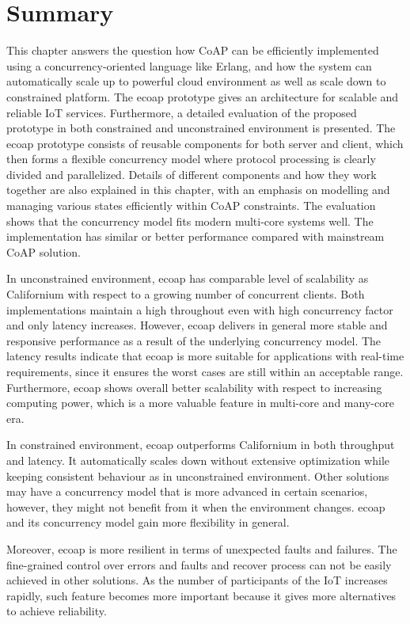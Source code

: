 \section{Summary}

This chapter answers the question how CoAP can be efficiently implemented using a concurrency-oriented language like Erlang, and how the system can automatically scale up to powerful cloud environment as well as scale down to constrained platform. The ecoap prototype gives an architecture for scalable and reliable IoT services. Furthermore, a detailed evaluation of the proposed prototype in both constrained and unconstrained environment is presented. The ecoap prototype consists of reusable components for both server and client, which then forms a flexible concurrency model where protocol processing is clearly divided and parallelized. Details of different components and how they work together are also explained in this chapter, with an emphasis on modelling and managing various states efficiently within CoAP constraints. The evaluation shows that the concurrency model fits modern multi-core systems well. The implementation has similar or better performance compared with mainstream CoAP solution. 

In unconstrained environment, ecoap has comparable level of scalability as Californium with respect to a growing number of concurrent clients. Both implementations maintain a high throughout even with high concurrency factor and only latency increases. However, ecoap delivers in general more stable and responsive performance as a result of the underlying concurrency model. The latency results indicate that ecoap is more suitable for applications with real-time requirements, since it ensures the worst cases are still within an acceptable range. Furthermore, ecoap shows overall better scalability with respect to increasing computing power, which is a more valuable feature in multi-core and many-core era.

In constrained environment, ecoap outperforms Californium in both throughput and latency. It automatically scales down without extensive optimization while keeping consistent behaviour as in unconstrained environment. Other solutions may have a concurrency model that is more advanced in certain scenarios, however, they might not benefit from it when the environment changes. ecoap and its concurrency model gain more flexibility in general.

Moreover, ecoap is more resilient in terms of unexpected faults and failures. The fine-grained control over errors and faults and recover process can not be easily achieved in other solutions. 
As the number of participants of the IoT increases rapidly, such feature becomes more important because it gives more alternatives to achieve reliability. 



